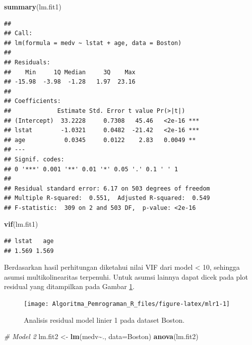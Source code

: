 \documentclass[
]{book}
\newenvironment{Shaded}{\begin{snugshade}}{\end{snugshade}}
\newcommand{\AttributeTok}[1]{\textcolor[rgb]{0.13,0.29,0.53}{#1}}
\newcommand{\CommentTok}[1]{\textcolor[rgb]{0.56,0.35,0.01}{\textit{#1}}}
\newcommand{\FunctionTok}[1]{\textcolor[rgb]{0.13,0.29,0.53}{\textbf{#1}}}
\newcommand{\NormalTok}[1]{#1}
\newcommand{\OtherTok}[1]{\textcolor[rgb]{0.56,0.35,0.01}{#1}}
\newcommand{\SpecialCharTok}[1]{\textcolor[rgb]{0.81,0.36,0.00}{\textbf{#1}}}
\theoremstyle{definition}
\theoremstyle{definition}
\theoremstyle{definition}
\theoremstyle{definition}
\theoremstyle{remark}
\begin{document}
\begin{Shaded}
\begin{Highlighting}[]
\FunctionTok{summary}\NormalTok{(lm.fit1)}
\end{Highlighting}
\end{Shaded}

\begin{verbatim}
## 
## Call:
## lm(formula = medv ~ lstat + age, data = Boston)
## 
## Residuals:
##    Min     1Q Median     3Q    Max 
## -15.98  -3.98  -1.28   1.97  23.16 
## 
## Coefficients:
##             Estimate Std. Error t value Pr(>|t|)    
## (Intercept)  33.2228     0.7308   45.46   <2e-16 ***
## lstat        -1.0321     0.0482  -21.42   <2e-16 ***
## age           0.0345     0.0122    2.83   0.0049 ** 
## ---
## Signif. codes:  
## 0 '***' 0.001 '**' 0.01 '*' 0.05 '.' 0.1 ' ' 1
## 
## Residual standard error: 6.17 on 503 degrees of freedom
## Multiple R-squared:  0.551,  Adjusted R-squared:  0.549 
## F-statistic:  309 on 2 and 503 DF,  p-value: <2e-16
\end{verbatim}

\begin{Shaded}
\begin{Highlighting}[]
\FunctionTok{vif}\NormalTok{(lm.fit1)}
\end{Highlighting}
\end{Shaded}

\begin{verbatim}
## lstat   age 
## 1.569 1.569
\end{verbatim}

Berdasarkan hasil perhitungan diketahui nilai VIF dari model \textless{} 10, sehingga asumsi multikolinearitas terpenuhi. Untuk asumsi lainnya dapat dicek pada plot residual yang ditampilkan pada Gambar \ref{fig:mlr1}.

\begin{figure}

{\centering \texttt{[image: Algoritma\_Pemrograman\_R\_files/figure-latex/mlr1-1]} 

}

\caption{Analisis residual model linier 1 pada dataset Boston.}\label{fig:mlr1}
\end{figure}

\begin{Shaded}
\begin{Highlighting}[]
\CommentTok{\# Model 2}
\NormalTok{lm.fit2 }\OtherTok{\textless{}{-}} \FunctionTok{lm}\NormalTok{(medv}\SpecialCharTok{\textasciitilde{}}\NormalTok{., }\AttributeTok{data=}\NormalTok{Boston)}
\FunctionTok{anova}\NormalTok{(lm.fit2)}
\end{Highlighting}
\end{Shaded}
\end{document}
